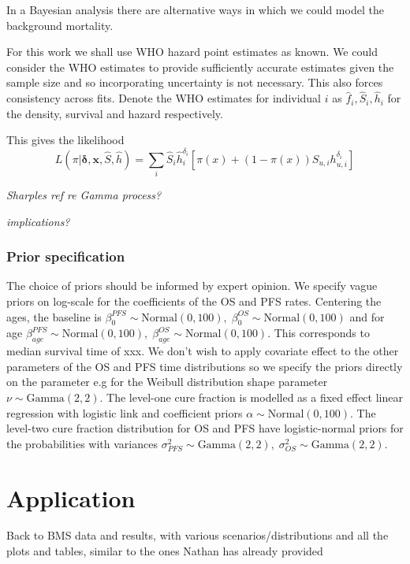 \documentclass[AMA,STIX1COL]{WileyNJD-v2}
\begin{document}
In a Bayesian analysis there are alternative ways in which we could
model the background mortality.

For this work we shall use WHO hazard point estimates as known. We could
consider the WHO estimates to provide sufficiently accurate estimates
given the sample size and so incorporating uncertainty is not necessary.
This also forces consistency across fits. Denote the WHO estimates for
individual $i$ as $\hat{f}_i, \hat{S}_i, \hat{h}_i$ for the density,
survival and hazard respectively.

This gives the likelihood
$$
L(\pi | \boldsymbol{\delta}, \boldsymbol{x}, \hat{S}, \hat{h}) =
\sum_i \hat{S}_i \hat{h}_i^{\delta_i} \left[ \pi(x) + (1 - \pi(x)) S_{u, i} h_{u , i}^{\delta_i} \right]
$$

{\it Sharples ref re Gamma process?}

{\it implications?}

\subsubsection{Prior specification}
The choice of priors should be informed by expert opinion.
We specify vague priors on log-scale for the coefficients of the OS and PFS rates. Centering the ages, the baseline is $\beta_0^{PFS} \sim \text{Normal}(0, 100),\; \beta_0^{OS} \sim \text{Normal}(0, 100)$ and for age $\beta_{age}^{PFS} \sim \text{Normal}(0, 100),\; \beta_{age}^{OS} \sim \text{Normal}(0, 100)$.
This corresponds to median survival time of xxx.
We don't wish to apply covariate effect to the other parameters of the OS and PFS time distributions so we specify the priors directly on the parameter e.g for the Weibull distribution shape parameter $\nu \sim \text{Gamma}(2, 2)$. 
The level-one cure fraction is modelled as a fixed effect linear regression with logistic link and coefficient priors $\alpha \sim \text{Normal}(0, 100)$.
The level-two cure fraction distribution for OS and PFS have logistic-normal priors for the probabilities with variances $\sigma^2_{PFS} \sim \text{Gamma}(2, 2),\; \sigma^2_{OS} \sim \text{Gamma}(2, 2)$.



\section{Application}\label{sec:application}

Back to BMS data and results, with various scenarios/distributions and all the plots and tables, similar to the ones Nathan has already provided
\end{document}
